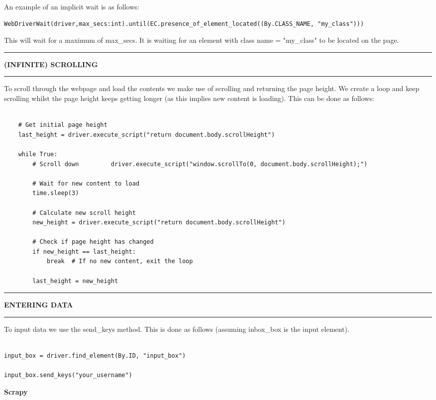 \documentclass[8pt]{extarticle}
\newcommand{\heading}[1]{%
    \noindent
    \rule{\linewidth}{0.4pt}
    \begin{center}
        \vspace{-1ex}
        \textbf{#1}        
        \vspace{-2.5ex}
    \end{center}
    \rule{\linewidth}{0.4pt}
}
\begin{document}
\begin{multicols}{3}
An example of an implicit wait is as follows:

\begin{lstlisting}[style=python]   
WebDriverWait(driver,max_secs:int).until(EC.presence_of_element_located((By.CLASS_NAME, "my_class")))
\end{lstlisting}

This will wait for a maximum of max\_secs. It is waiting for an element with class name = "my\_class" to be located on the page.

\heading{(INFINITE) SCROLLING}

To scroll through the webpage and load the contents we make use of scrolling and returning the page height. We create a loop and keep scrolling whilst the page height keeps getting longer (as this implies new content is loading). This can be done as follows:

\begin{lstlisting}[style=python]     

    # Get initial page height
    last_height = driver.execute_script("return document.body.scrollHeight")
    
    while True:
        # Scroll down         driver.execute_script("window.scrollTo(0, document.body.scrollHeight);")
    
        # Wait for new content to load
        time.sleep(3)
    
        # Calculate new scroll height
        new_height = driver.execute_script("return document.body.scrollHeight")
    
        # Check if page height has changed
        if new_height == last_height:
            break  # If no new content, exit the loop
    
        last_height = new_height
\end{lstlisting}

\heading{ENTERING DATA}

To input data we use the send\_keys method. This is done as follows (assuming inbox\_box is the input element).

\begin{lstlisting}[style=python]     

input_box = driver.find_element(By.ID, "input_box") 

input_box.send_keys("your_username") 
\end{lstlisting}

\newpage
\end{multicols}

\begin{center}
{\huge\textbf{Scrapy}}
\vspace*{0.75cm}
\end{center}
\end{document}
